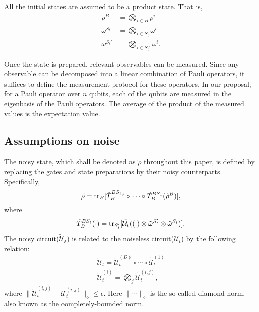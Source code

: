 \documentclass[prx,aps,amsmath,amssymb,floatfix,superscriptaddress,11pt,tightenlines,longbibliography,onecolumn,notitlepage]{revtex4-1}
\newcommand{\Tr}{\textnormal{tr}}
\begin{document}
All the initial states are assumed to be a product state. That is,
\begin{equation}
  \begin{aligned}
    \rho^{B} &= \bigotimes_{i\in B} \rho^i \\
    \omega^{S_t} &= \bigotimes_{i\in S_t} \omega^i \\
    \omega^{S_t'} &= \bigotimes_{i\in S_t'} \omega^i.
  \end{aligned}
\end{equation}

Once the state is prepared, relevant observables can be measured. Since any observable can be decomposed into a linear combination of Pauli operators, it suffices to define the measurement protocol for these operators. In our proposal, for a Pauli operator over $n$ qubits, each of the qubits are measured in the eigenbasis of the Pauli operators. The average of the product of the measured values is the expectation value.

\subsection{Assumptions on noise\label{section:noise}}
 The noisy state, which shall be denoted as $\tilde{\rho}$ throughout this paper, is defined by replacing the gates and state preparations by their noisy counterparts. Specifically,
\begin{equation}
\tilde{\rho} = \Tr_B[\tilde{T}_B^{BS_{\ell_y}} \circ \cdots \circ \tilde{T}_{B}^{BS_1}(\tilde{\rho}^B)],
\end{equation}
where
\begin{equation}
\tilde{T}_B^{BS_t}(\cdot) = \Tr_{S_t'}[\mathcal{\tilde{U}}_t((\cdot) \otimes \tilde{\omega}^{S_t'} \otimes \tilde{\omega}^{S_t})].
\end{equation}
The noisy circuit($\mathcal{\tilde{U}}_t$) is related to the noiseless circuit($\mathcal{U}_t$) by the following relation:
\begin{equation}
  \begin{aligned}
    \tilde{\mathcal{U}}_t = \tilde{\mathcal{U}}_t^{(D)} \circ \cdots \circ \tilde{\mathcal{U}}_t^{(1)}\\
    \tilde{\mathcal{U}}_t^{(i)} = \bigotimes_{j} \tilde{\mathcal{U}}_t^{(i,j)},
  \end{aligned}
\end{equation}
where $\|\tilde{\mathcal{U}}_{t}^{(i,j)} - \mathcal{U}_t^{(i,j)} \|_{\diamond} \leq \epsilon$. Here $\|\cdots \|_{\diamond}$ is the so called diamond norm, also known as the completely-bounded norm\cite{Kitaev2002}.
\end{document}
